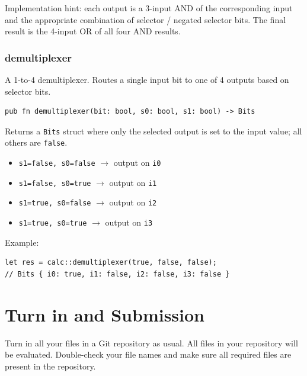 \documentclass[a4paper,12pt]{report}
\begin{document}
Implementation hint: each output is a 3-input AND of the corresponding input and the appropriate combination of selector / negated selector bits. The final result is the 4-input OR of all four AND results.

\vspace{1.5cm}

\subsection*{demultiplexer}
A 1-to-4 demultiplexer. Routes a single input bit to one of 4 outputs based on selector bits.

\begin{lstlisting}
pub fn demultiplexer(bit: bool, s0: bool, s1: bool) -> Bits
\end{lstlisting}

Returns a \texttt{Bits} struct where only the selected output is set to the input value; all others are \texttt{false}.

\begin{itemize}
    \item \texttt{s1=false, s0=false} $\rightarrow$ output on \texttt{i0}
    \item \texttt{s1=false, s0=true} $\rightarrow$ output on \texttt{i1}
    \item \texttt{s1=true, s0=false} $\rightarrow$ output on \texttt{i2}
    \item \texttt{s1=true, s0=true} $\rightarrow$ output on \texttt{i3}
\end{itemize}

\vspace{0.3cm}

Example:
\begin{lstlisting}
let res = calc::demultiplexer(true, false, false);
// Bits { i0: true, i1: false, i2: false, i3: false }
\end{lstlisting}

\chapter{Turn in and Submission}

\vspace{0.5cm}

Turn in all your files in a Git repository as usual. All files in your repository
will be evaluated. Double-check your file names and make sure all required files are
present in the repository.

\end{document}
